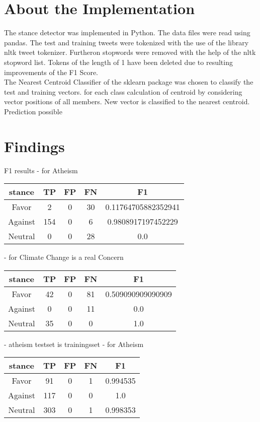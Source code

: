 \documentclass[a4paper,12pt,twoside]{article}
\begin{document}
\section{About the Implementation}
The stance detector was implemented in Python. The data files were read using pandas. The test and training tweets were tokenized with the use of the library nltk tweet tokenizer. Furtheron stopwords were removed with the help of the nltk stopword list.
Tokens of the length of 1 have been deleted due to resulting improvements of the F1 Score. \\
The Nearest Centroid Classifier  of the sklearn package was chosen to classify the test and training vectors.
for each class calculation of centroid by considering vector positions of all members.
New vector is classified to the nearest centroid. Prediction possible



\section{Findings}

F1 results
- for Atheism

\begin{tabular}{c|ccc|c}
stance & TP & FP & FN & F1\\ \hline
Favor & 2 & 0 & 30 & 0.11764705882352941\\
Against & 154 & 0 & 6 & 0.9808917197452229 \\
Neutral & 0 & 0 & 28 & 0.0 \\
\end{tabular}



- for Climate Change is a real Concern \\
\begin{tabular}{c|ccc|c}
stance & TP & FP & FN & F1\\ \hline
Favor & 42 & 0 & 81 & 0.509090909090909\\
Against & 0 & 0 & 11 & 0.0\\
Neutral & 35 & 0 & 0 & 1.0 \\
\end{tabular}


- atheism testset is trainingsset
- for Atheism

\begin{tabular}{c|ccc|c}
stance & TP & FP & FN & F1\\ \hline
Favor & 91 & 0 & 1 & 0.994535\\
Against & 117 & 0 & 0 & 1.0\\
Neutral &  303 & 0 & 1 & 0.998353\\
\end{tabular}
\end{document}
